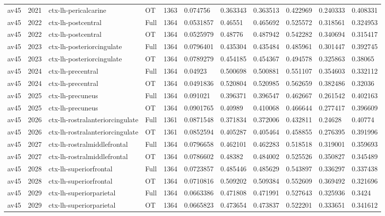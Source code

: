 \begin{landscape}
\begin{longtable}{lllllllllll}
av45 & 2021 & ctx-lh-pericalcarine & OT & 1363 & 0.074756 & 0.363343 & 0.363513 & 0.422969 & 0.240333 & 0.408331 \\
av45 & 2022 & ctx-lh-postcentral & Full & 1364 & 0.0531857 & 0.46551 & 0.465692 & 0.525572 & 0.318561 & 0.324953 \\
av45 & 2022 & ctx-lh-postcentral & OT & 1364 & 0.0525979 & 0.48776 & 0.487942 & 0.542282 & 0.340694 & 0.315417 \\
av45 & 2023 & ctx-lh-posteriorcingulate & Full & 1364 & 0.0796401 & 0.435304 & 0.435484 & 0.485961 & 0.301447 & 0.392745 \\
av45 & 2023 & ctx-lh-posteriorcingulate & OT & 1364 & 0.0789279 & 0.454185 & 0.454367 & 0.494578 & 0.325863 & 0.38065 \\
av45 & 2024 & ctx-lh-precentral & Full & 1364 & 0.04923 & 0.500698 & 0.500881 & 0.551107 & 0.354603 & 0.332112 \\
av45 & 2024 & ctx-lh-precentral & OT & 1364 & 0.0491836 & 0.520804 & 0.520985 & 0.562659 & 0.382486 & 0.32036 \\
av45 & 2025 & ctx-lh-precuneus & Full & 1364 & 0.091021 & 0.396371 & 0.396547 & 0.462667 & 0.261542 & 0.402163 \\
av45 & 2025 & ctx-lh-precuneus & OT & 1364 & 0.0901765 & 0.40989 & 0.410068 & 0.466644 & 0.277417 & 0.396609 \\
av45 & 2026 & ctx-lh-rostralanteriorcingulate & Full & 1361 & 0.0871548 & 0.371834 & 0.372006 & 0.432811 & 0.24628 & 0.40774 \\
av45 & 2026 & ctx-lh-rostralanteriorcingulate & OT & 1361 & 0.0852594 & 0.405287 & 0.405464 & 0.458855 & 0.276395 & 0.391996 \\
av45 & 2027 & ctx-lh-rostralmiddlefrontal & Full & 1364 & 0.0796658 & 0.462101 & 0.462283 & 0.518518 & 0.319001 & 0.359693 \\
av45 & 2027 & ctx-lh-rostralmiddlefrontal & OT & 1364 & 0.0786602 & 0.48382 & 0.484002 & 0.525526 & 0.350827 & 0.345489 \\
av45 & 2028 & ctx-lh-superiorfrontal & Full & 1364 & 0.0723857 & 0.485446 & 0.485629 & 0.543897 & 0.336297 & 0.337438 \\
av45 & 2028 & ctx-lh-superiorfrontal & OT & 1364 & 0.0710816 & 0.509202 & 0.509384 & 0.552609 & 0.369492 & 0.321696 \\
av45 & 2029 & ctx-lh-superiorparietal & Full & 1364 & 0.0663386 & 0.471808 & 0.471991 & 0.527643 & 0.325936 & 0.3424 \\
av45 & 2029 & ctx-lh-superiorparietal & OT & 1364 & 0.0665823 & 0.473654 & 0.473837 & 0.522201 & 0.333651 & 0.341612 \\

\end{longtable}
\end{landscape}
